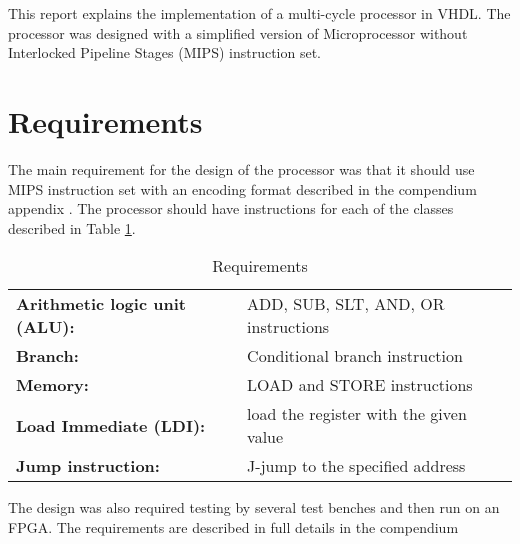 \documentclass[../report.tex]{subfiles}
\begin{document}
This report explains the implementation of a multi-cycle processor in VHDL. The processor was designed with a simplified version of Microprocessor without Interlocked Pipeline Stages (MIPS) instruction set. 

\section{Requirements}

The main requirement for the design of the processor was that it should use MIPS instruction set with an encoding format described in the compendium appendix \cite[p. 64]{compendium}. The processor should have instructions for each of the classes described in Table \ref{t:req}.

\begin{table}[H]
     \caption {Requirements}
	\label{t:req}
    \centering
    \begin{tabular} {l l}
       	 \bf Arithmetic logic unit (ALU): & ADD, SUB, SLT, AND, OR instructions \\
       	 \bf Branch: & Conditional branch instruction \\
	     \bf Memory: & LOAD and STORE instructions  \\
	     \bf Load Immediate (LDI): & load the register with the given value \\
	     \bf Jump instruction: & J-jump to the specified address \\

    \end{tabular}
\end{table}


The design was also required testing by several test benches and then run on an FPGA. The requirements are described in full details in the compendium \cite[p. 44]{compendium}
\end{document}
